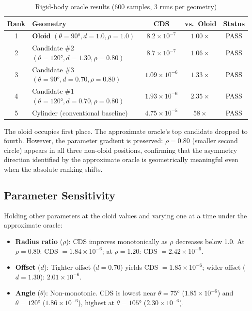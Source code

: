 \documentclass[11pt,a4paper]{article}
\begin{document}
\begin{table}[h]
\centering
\caption{Rigid-body oracle results (600 samples, 3 runs per geometry)}
\label{tab:results}
\begin{tabular}{clccc}
\toprule
Rank & Geometry & CDS & vs.\ Oloid & Status \\
\midrule
1 & \textbf{Oloid} $(\theta\!=\!90°, d\!=\!1.0, \rho\!=\!1.0)$
  & $8.2 \times 10^{-7}$ & $1.00\times$ & PASS \\
2 & Candidate \#2 $(\theta\!=\!120°, d\!=\!1.30, \rho\!=\!0.80)$
  & $8.7 \times 10^{-7}$ & $1.06\times$ & PASS \\
3 & Candidate \#3 $(\theta\!=\!90°, d\!=\!0.70, \rho\!=\!0.80)$
  & $1.09 \times 10^{-6}$ & $1.33\times$ & PASS \\
4 & Candidate \#1 $(\theta\!=\!120°, d\!=\!0.70, \rho\!=\!0.80)$
  & $1.93 \times 10^{-6}$ & $2.35\times$ & PASS \\
5 & Cylinder (conventional baseline)
  & $4.75 \times 10^{-5}$ & $58\times$ & PASS \\
\bottomrule
\end{tabular}
\end{table}

The oloid occupies first place. The approximate oracle's top candidate
dropped to fourth. However, the parameter gradient is preserved:
$\rho = 0.80$ (smaller second circle) appears in all three non-oloid
positions, confirming that the asymmetry direction identified by the
approximate oracle is geometrically meaningful even when the absolute
ranking shifts.

\subsection{Parameter Sensitivity}

Holding other parameters at the oloid values and varying one at a time
under the approximate oracle:

\begin{itemize}[leftmargin=*]
  \item \textbf{Radius ratio} ($\rho$): CDS improves monotonically as
    $\rho$ decreases below 1.0. At $\rho = 0.80$: CDS $= 1.84 \times
    10^{-6}$; at $\rho = 1.20$: CDS $= 2.42 \times 10^{-6}$.
  \item \textbf{Offset} ($d$): Tighter offset ($d = 0.70$) yields CDS
    $= 1.85 \times 10^{-6}$; wider offset ($d = 1.30$): $2.01 \times
    10^{-6}$.
  \item \textbf{Angle} ($\theta$): Non-monotonic. CDS is lowest near
    $\theta = 75°$ ($1.85 \times 10^{-6}$) and $\theta = 120°$
    ($1.86 \times 10^{-6}$), highest at $\theta = 105°$
    ($2.30 \times 10^{-6}$).
\end{itemize}
\end{document}
